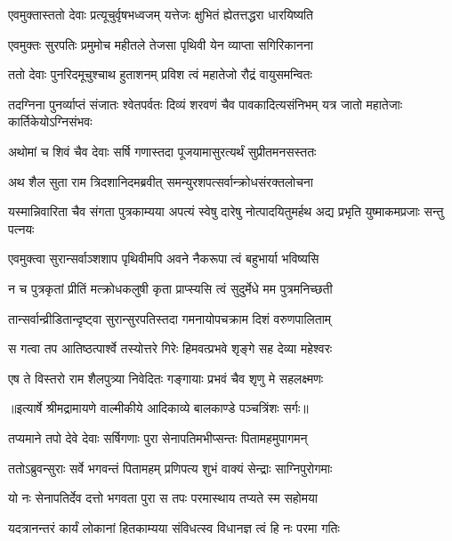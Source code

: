 \twolineshloka
{एवमुक्तास्ततो देवाः प्रत्यूचुर्वृषभध्वजम्}
{यत्तेजः क्षुभितं ह्येतत्तद्धरा धारयिष्यति} %

\twolineshloka
{एवमुक्तः सुरपतिः प्रमुमोच महीतले}
{तेजसा पृथिवी येन व्याप्ता सगिरिकानना} %

\twolineshloka
{ततो देवाः पुनरिदमूचुश्चाथ हुताशनम्}
{प्रविश त्वं महातेजो रौद्रं वायुसमन्वितः} %

\threelineshloka
{तदग्निना पुनर्व्याप्तं संजातः श्वेतपर्वतः}
{दिव्यं शरवणं चैव पावकादित्यसंनिभम्}
{यत्र जातो महातेजाः कार्तिकेयोऽग्निसंभवः} %

\twolineshloka
{अथोमां च शिवं चैव देवाः सर्षि गणास्तदा}
{पूजयामासुरत्यर्थं सुप्रीतमनसस्ततः} %

\twolineshloka
{अथ शैल सुता राम त्रिदशानिदमब्रवीत्}
{समन्युरशपत्सर्वान्क्रोधसंरक्तलोचना} %

\threelineshloka
{यस्मान्निवारिता चैव संगता पुत्रकाम्यया}
{अपत्यं स्वेषु दारेषु नोत्पादयितुमर्हथ}
{अद्य प्रभृति युष्माकमप्रजाः सन्तु पत्नयः} %

\twolineshloka
{एवमुक्त्वा सुरान्सर्वाञ्शशाप पृथिवीमपि}
{अवने नैकरूपा त्वं बहुभार्या भविष्यसि} %

\twolineshloka
{न च पुत्रकृतां प्रीतिं मत्क्रोधकलुषी कृता}
{प्राप्स्यसि त्वं सुदुर्मेधे मम पुत्रमनिच्छती} %

\twolineshloka
{तान्सर्वान्व्रीडितान्दृष्ट्वा सुरान्सुरपतिस्तदा}
{गमनायोपचक्राम दिशं वरुणपालिताम्} %

\twolineshloka
{स गत्वा तप आतिष्ठत्पार्श्वे तस्योत्तरे गिरेः}
{हिमवत्प्रभवे शृङ्गे सह देव्या महेश्वरः} %

\twolineshloka
{एष ते विस्तरो राम शैलपुत्र्या निवेदितः}
{गङ्गायाः प्रभवं चैव शृणु मे सहलक्ष्मणः} %


{॥इत्यार्षे श्रीमद्रामायणे वाल्मीकीये आदिकाव्ये बालकाण्डे पञ्चत्रिंशः सर्गः॥}


\twolineshloka
{तप्यमाने तपो देवे देवाः सर्षिगणाः पुरा}
{सेनापतिमभीप्सन्तः पितामहमुपागमन्} %

\twolineshloka
{ततोऽब्रुवन्सुराः सर्वे भगवन्तं पितामहम्}
{प्रणिपत्य शुभं वाक्यं सेन्द्राः साग्निपुरोगमाः} %

\twolineshloka
{यो नः सेनापतिर्देव दत्तो भगवता पुरा}
{स तपः परमास्थाय तप्यते स्म सहोमया} %

\twolineshloka
{यदत्रानन्तरं कार्यं लोकानां हितकाम्यया}
{संविधत्स्व विधानज्ञ त्वं हि नः परमा गतिः} %

